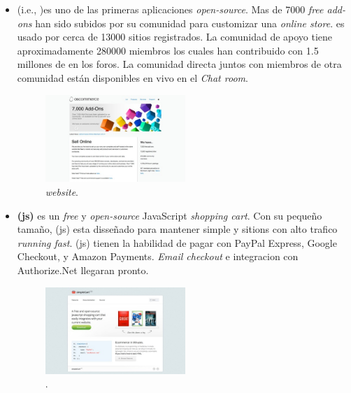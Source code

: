 \begin{itemize}
	\item \textbf{\nameOsCommerce} (i.e., \opensource \commerce)es uno de las primeras aplicaciones \ecommerce \textit{open-source}. Mas de 7000 \textit{free add-ons} han sido subidos por su comunidad para customizar una  \textit{online store}. \nameOsCommerce es usado por cerca de 13000 sitios registrados. La comunidad de apoyo tiene aproximadamente 280000 miembros los cuales han contribuido con 1.5 millones de \posts en los foros. La comunidad directa juntos con miembros de otra comunidad están disponibles en vivo en el \textit{Chat room}.

	\begin{figure}[h!]
		\centering
		\includegraphics[width=0.5\textwidth]{figuras/cap1/osCommerceWebsite.jpg}
		\caption{\nameOsCommerce \textit{website}\cite{online_osCommerce}.}
	\end{figure}

	\item \textbf{\nameSimpleCart (js)} es un \textit{free} y \textit{open-source} JavaScript \textit{shopping cart}. Con su pequeño tamaño, \nameSimpleCart(js) esta disseñado para mantener simple  y sitions con alto trafico \textit{running fast}. \nameSimpleCart(js) tienen la habilidad de pagar con PayPal Express, Google Checkout, y Amazon Payments. \textit{Email checkout} e integracion con  Authorize.Net llegaran pronto.
	
	\begin{figure}[h!]
		\centering
		\includegraphics[width=0.5\textwidth]{figuras/cap1/simpleCartWebsite.jpg}
		\caption{\nameSimpleCart \website\cite{online_simpleCart}.}
	\end{figure}


\end{itemize}
